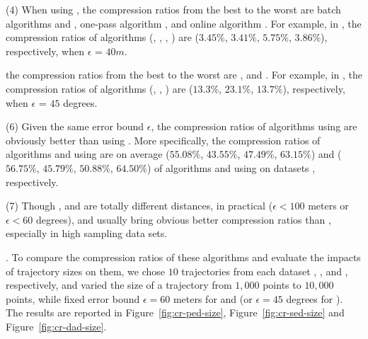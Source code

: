 \sstab (4) When using \sed, the compression ratios from the best
to the worst are batch algorithms \tpa and
\dpa, one-pass algorithm \cised, and online algorithm \squishe.
For example, in \mopsi, the compression ratios of algorithms
(\tpa, \dpa, \squishe, \cised)
are ($3.45\%$, $3.41\%$, $5.75\%$, $3.86\%$), respectively, when $\epsilon$ = $40m$.

%

 the compression ratios from the best to the worst are \tpa, \interval and \dpa.
For example, in \mopsi, the compression ratios of algorithms (\tpa, \dpa, \interval)
are ($13.3\%$, $23.1\%$, $13.7\%$), respectively, when $\epsilon$ = $45$ degrees.


\sstab (6) Given the same error bound $\epsilon$, the compression ratios of algorithms using \ped are obviously better
than using \sed.
More specifically, the compression ratios of algorithms \tpa and \dpa
using \ped are on average ($55.08\%$, $43.55\%$, $47.49\%$, $63.15\%$) and ($56.75\%$, $45.79\%$,
$50.88\%$, $64.50\%$) of algorithms \tpa and \dpa using \sed on datasets \dSets, respectively.
	
\sstab (7) Though \ped, \sed and \dad are totally different distances, in practical (\eg $\epsilon <100$ meters or $\epsilon < 60$ degrees), \ped and \sed usually bring obvious better compression ratios than \dad, especially in high sampling data sets.

.
To compare the compression ratios of these algorithms and evaluate the impacts of trajectory sizes on them, we chose $10$ trajectories from each dataset \taxi, \ucar, \geolife and \mopsi, respectively,
and varied the size  of a trajectory from $1,000$ points to $10,000$ points, while fixed error bound $\epsilon = 60$ meters for \ped and \sed ({or $\epsilon = 45$ degrees for \dad}).
The results are reported in Figure~\ref{fig:cr-ped-size}, Figure~\ref{fig:cr-sed-size} and Figure~\ref{fig:cr-dad-size}.



